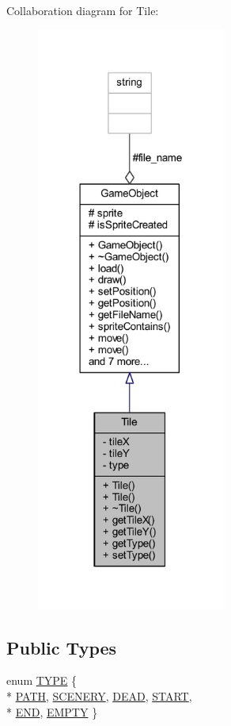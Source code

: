 Collaboration diagram for Tile\+:
\nopagebreak
\begin{figure}[H]
\begin{center}
\leavevmode
\includegraphics[width=177pt]{class_tile__coll__graph}
\end{center}
\end{figure}
\subsection*{Public Types}
\begin{DoxyCompactItemize}
\item 
enum \hyperlink{class_tile_acb53d82f9dacff45a98acc63276928eb}{T\+Y\+P\+E} \{ \\*
\hyperlink{class_tile_acb53d82f9dacff45a98acc63276928eba9001b4829dca656f3c100d3a8069a466}{P\+A\+T\+H}, 
\hyperlink{class_tile_acb53d82f9dacff45a98acc63276928eba669ab57a19953e968fa340f2ee96962a}{S\+C\+E\+N\+E\+R\+Y}, 
\hyperlink{class_tile_acb53d82f9dacff45a98acc63276928ebab89feda40ad0da6fef5e8c0b9ee76410}{D\+E\+A\+D}, 
\hyperlink{class_tile_acb53d82f9dacff45a98acc63276928ebae07eb3a350a6654b081757585cd76e07}{S\+T\+A\+R\+T}, 
\\*
\hyperlink{class_tile_acb53d82f9dacff45a98acc63276928ebabe602dcbe043275048d7cb0f2df6c2db}{E\+N\+D}, 
\hyperlink{class_tile_acb53d82f9dacff45a98acc63276928eba410bd5c2074558a74ff688ff43723296}{E\+M\+P\+T\+Y}
 \}
\end{DoxyCompactItemize}
